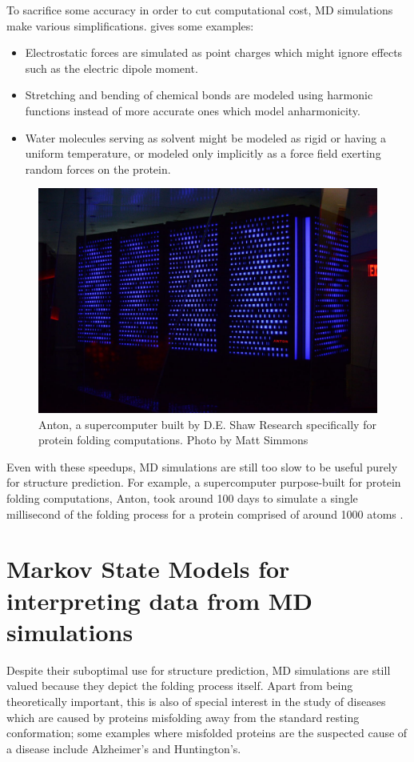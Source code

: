 \documentclass{article}
\begin{document}
To sacrifice some accuracy in order to cut computational cost, MD simulations make various simplifications. \cite{md} gives some examples:

\begin{itemize}
    \item Electrostatic forces are simulated as point charges which might ignore effects such as the electric dipole moment.
    \item Stretching and bending of chemical bonds are modeled using harmonic functions instead of more accurate ones which model anharmonicity.
    \item Water molecules serving as solvent might be modeled as rigid or having a uniform temperature, or modeled only implicitly as a force field exerting random forces on the protein.
\end{itemize} 

\begin{figure}[ht]
  \includegraphics[width=\linewidth]{images/anton.jpg}
  \caption{Anton, a supercomputer built by D.E. Shaw Research specifically for protein folding computations. \cite{Anton} Photo by Matt Simmons}
  \label{fig:anton}
\end{figure}

Even with these speedups, MD simulations are still too slow to be useful purely for structure prediction. For example, a supercomputer purpose-built for protein folding computations, Anton, took around 100 days to simulate a single millisecond of the folding process for a protein comprised of around 1000 atoms \cite{Anton}.

\section{Markov State Models for interpreting data from MD simulations}
Despite their suboptimal use for structure prediction, MD simulations are still valued because they depict the folding process itself. Apart from being theoretically important, this is also of special interest in the study of diseases which are caused by proteins misfolding away from the standard resting conformation; some examples where misfolded proteins are the suspected cause of a disease include Alzheimer's and Huntington's.
\end{document}
